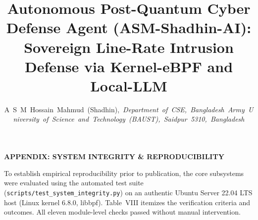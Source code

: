 \documentclass[journal,onecolumn]{IEEEtran}
\begin{document}
\title{\LARGE Autonomous Post-Quantum Cyber Defense Agent (ASM-Shadhin-AI): Sovereign Line-Rate Intrusion Defense via Kernel-eBPF and Local-LLM}

\author{\large A~S~M~Hossain~Mahmud~(Shadhin),~\textit{Department~of~CSE,~Bangladesh~Army~University~of~Science~and~Technology~(BAUST),~Saidpur~5310,~Bangladesh}}

\maketitle
\thispagestyle{plain}

\vspace{-1.5em}
\begin{center}
\textbf{\large APPENDIX: SYSTEM INTEGRITY \& REPRODUCIBILITY}
\end{center}
\vspace{0.8em}

\noindent To establish empirical reproducibility prior to publication, the core subsystems were evaluated using the automated test suite (\texttt{scripts/test\_system\_integrity.py}) on an authentic Ubuntu Server 22.04 LTS host (Linux kernel 6.8.0, libbpf). Table~VIII itemizes the verification criteria and outcomes. All eleven module-level checks passed without manual intervention.

\vspace{1.5em}
\end{document}
